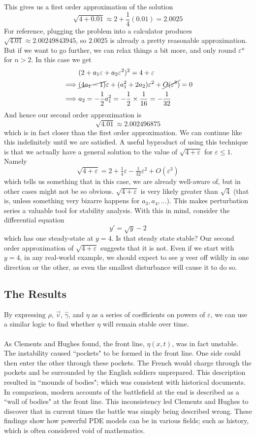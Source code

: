 \documentclass{article}
\begin{document}
This gives us a first order approximation of the solution
\[
    \sqrt{4+0.01}\approx 2+\frac 14(0.01)=2.0025
\]
For reference, plugging the problem into a calculator produces $\sqrt{4.01}\approx 2.00249843945$, so $2.0025$ is already a pretty reasonable approximation. But if we want to go further, we can relax things a bit more, and only round $\varepsilon^n$ for $n>2$. In this case we get
\begin{align*}
    &
    (2+a_1\varepsilon+a_2\varepsilon^2)^2=4+\varepsilon
    \\\implies&
    \cancel{(4a_1-1)}\varepsilon+(a_1^2+2a_2)\varepsilon^2+\cancel{O(\varepsilon^3)}=0
    \\\implies&
    a_2=-\frac 12 a_1^2=-\frac 12 \times \frac 1{16}=-\frac 1{32}
\end{align*}
And hence our second order approximation is
\[
    \sqrt{4.01}\approx 2.002496875
\]
which is in fact closer than the first order approximation. We can continue like this indefinitely until we are satisfied. A useful byproduct of using this technique is that we actually have a general solution to the value of $\sqrt{4+\varepsilon}$ for $\varepsilon\le 1$. Namely
\[
    \sqrt{4+\varepsilon}=2+\tfrac 14\varepsilon-\tfrac 1{32}\varepsilon^2+O(\varepsilon^3)
\]
which tells us something that in this case, we are already well-aware of, but in other cases might not be so obvious. $\sqrt{4+\varepsilon}$ is very likely greater than $\sqrt{4}$ (that is, unless something very bizarre happens for $a_3,a_4,...$). This makes perturbation series a valuable tool for stability analysis. With this in mind, consider the differential equation
\[
    y'=\sqrt y-2
\]
which has one steady-state at $y=4$. Is that steady state stable? Our second order approximation of $\sqrt{4+\varepsilon}$ suggests that it is not. Even if we start with $y=4$, in any real-world example, we should expect to see $y$ veer off wildly in one direction or the other, as even the smallest disturbance will cause it to do so.

\subsection{The Results}
By expressing $\rho$, $\vec v$, $\hat\gamma$, and $\eta$ as a series of coefficients on powers of $\varepsilon$, we can use a similar logic to find whether $\eta$ will remain stable over time. \\
\\
As Clements and Hughes found, the front line, $\eta(x,t)$, was in fact unstable. The instability caused ``pockets" to be formed in the front line. One side could then enter the other through these pockets. The French would charge through the pockets and be surrounded by the English soldiers unprepared. This description resulted in ``mounds of bodies"; which was consistent with historical documents. In comparison, modern accounts of the battlefield at the end is described as a ``wall of bodies" at the front line. This inconsistency led Clements and Hughes to discover that in current times the battle was simply being described wrong. These findings show how powerful PDE models can be in various fields; such as history, which is often considered void of mathematics.
\end{document}
